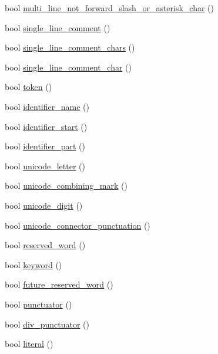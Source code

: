 \begin{DoxyCompactItemize}
bool \hyperlink{class_lexical_grammar_af0448c41bb8e0b33c87e4d649687a062}{multi\+\_\+line\+\_\+not\+\_\+forward\+\_\+slash\+\_\+or\+\_\+asterisk\+\_\+char} ()
\item 
bool \hyperlink{class_lexical_grammar_a3cca7bf99de3efe2e82b1ec05b091fe0}{single\+\_\+line\+\_\+comment} ()
\item 
bool \hyperlink{class_lexical_grammar_a39acd5ac2f507d10b9cd7eb905b6c6d9}{single\+\_\+line\+\_\+comment\+\_\+chars} ()
\item 
bool \hyperlink{class_lexical_grammar_a256890ff18017f982160830c3b08b4ac}{single\+\_\+line\+\_\+comment\+\_\+char} ()
\item 
bool \hyperlink{class_lexical_grammar_ac728c2390815a0710dcf393763771f2c}{token} ()
\item 
bool \hyperlink{class_lexical_grammar_a851951b0798abd9c6fdf0ae3e49d299b}{identifier\+\_\+name} ()
\item 
bool \hyperlink{class_lexical_grammar_af2c12dfb0b07685c3b01779e4ae4e359}{identifier\+\_\+start} ()
\item 
bool \hyperlink{class_lexical_grammar_a744e87b07d654b2769e5f0855b30c870}{identifier\+\_\+part} ()
\item 
bool \hyperlink{class_lexical_grammar_aee36e7e578912a00215f3a66778c191f}{unicode\+\_\+letter} ()
\item 
bool \hyperlink{class_lexical_grammar_ab16506f8bcae0aa05d7f6971d0355d9c}{unicode\+\_\+combining\+\_\+mark} ()
\item 
bool \hyperlink{class_lexical_grammar_a20b4e0f9757bcace278e8d711efb09da}{unicode\+\_\+digit} ()
\item 
bool \hyperlink{class_lexical_grammar_a632307d996a33ac3089d53068ba9c21d}{unicode\+\_\+connector\+\_\+punctuation} ()
\item 
bool \hyperlink{class_lexical_grammar_a1d60ff9552b12f9c30a9dc94b329530d}{reserved\+\_\+word} ()
\item 
bool \hyperlink{class_lexical_grammar_a609dc2ff60d85011034954b805ebd077}{keyword} ()
\item 
bool \hyperlink{class_lexical_grammar_a588be2892f65d3367dfd049174532c17}{future\+\_\+reserved\+\_\+word} ()
\item 
bool \hyperlink{class_lexical_grammar_a1d2f4fe7c1039c89dbbe4309f7a2d35a}{punctuator} ()
\item 
bool \hyperlink{class_lexical_grammar_a37ea4db956749e0519e34ec8e304d2fb}{div\+\_\+punctuator} ()
\item 
bool \hyperlink{class_lexical_grammar_aae192a9c337028f4edbfe210e587d2dc}{literal} ()

\end{DoxyCompactItemize}
